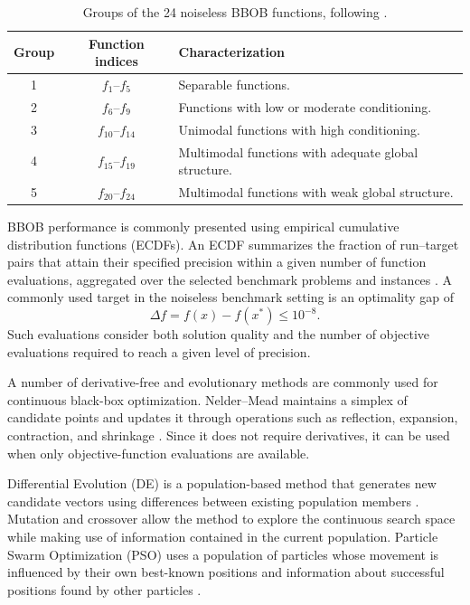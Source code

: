 \begin{table}[htbp]
    \centering
    \caption{Groups of the 24 noiseless BBOB functions, following
    \cite{BBOB2009}.}
    \label{tab:bbob_groups}
    \small
    \begin{tabularx}{\textwidth}{c c X}
        \toprule
        \textbf{Group} &
        \textbf{Function indices} &
        \textbf{Characterization} \\
        \midrule
        1 & $f_1$--$f_5$ &
        Separable functions. \\
        2 & $f_6$--$f_9$ &
        Functions with low or moderate conditioning. \\
        3 & $f_{10}$--$f_{14}$ &
        Unimodal functions with high conditioning. \\
        4 & $f_{15}$--$f_{19}$ &
        Multimodal functions with adequate global structure. \\
        5 & $f_{20}$--$f_{24}$ &
        Multimodal functions with weak global structure. \\
        \bottomrule
    \end{tabularx}
\end{table}

BBOB performance is commonly presented using empirical cumulative
distribution functions (ECDFs). An ECDF summarizes the fraction of run--target
pairs that attain their specified precision within a given number of function
evaluations, aggregated over the selected benchmark problems and instances
\cite{Hansen2016Performance}. A commonly used target in the noiseless
benchmark setting is an optimality gap of
\begin{equation}
    \Delta f = f(x)-f(x^*) \leq 10^{-8}.
\end{equation}
Such evaluations consider both solution quality and the number of objective
evaluations required to reach a given level of precision.

A number of derivative-free and evolutionary methods are commonly used for
continuous black-box optimization. Nelder--Mead maintains a simplex of
candidate points and updates it through operations such as reflection,
expansion, contraction, and shrinkage \cite{Nelder1965}. Since it does not
require derivatives, it can be used when only objective-function evaluations
are available.

Differential Evolution (DE) is a population-based method that generates new
candidate vectors using differences between existing population members
\cite{Storn1997}. Mutation and crossover allow the method to explore the
continuous search space while making use of information contained in the
current population. Particle Swarm Optimization (PSO) uses a population of
particles whose movement is influenced by their own best-known positions
and information about successful positions found by other particles
\cite{Kennedy1995}.

